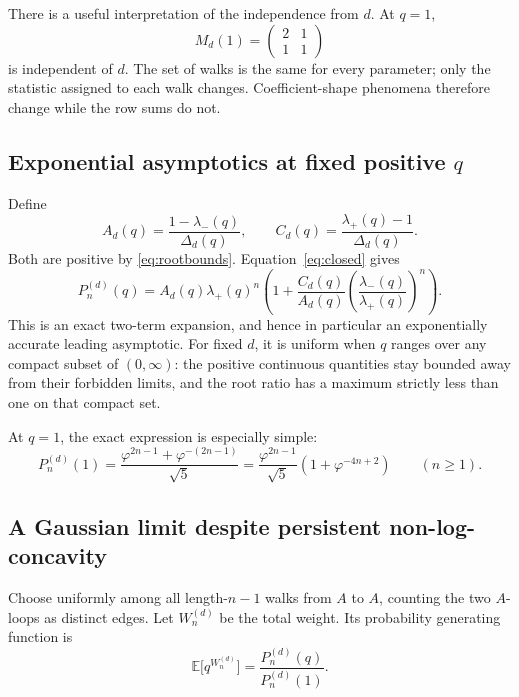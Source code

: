 \documentclass[11pt,letterpaper]{article}
\numberwithin{equation}{section}
\theoremstyle{definition}
\newcommand{\EE}{\mathbb E}
\begin{document}
There is a useful interpretation of the independence from $d$. At $q=1$,
\[
 M_d(1)=\begin{pmatrix}2&1\\1&1\end{pmatrix}
\]
is independent of $d$. The set of walks is the same for every parameter;
only the statistic assigned to each walk changes. Coefficient-shape phenomena
therefore change while the row sums do not.

\subsection{Exponential asymptotics at fixed positive \texorpdfstring{$q$}{q}}

Define
\[
 A_d(q)=\frac{1-\lambda_-(q)}{\Delta_d(q)},\qquad
 C_d(q)=\frac{\lambda_+(q)-1}{\Delta_d(q)}.
\]
Both are positive by \eqref{eq:rootbounds}. Equation~\eqref{eq:closed} gives
\begin{equation}\label{eq:asymp}
 P_n^{(d)}(q)=A_d(q)\lambda_+(q)^n
 \left(1+\frac{C_d(q)}{A_d(q)}
              \left(\frac{\lambda_-(q)}{\lambda_+(q)}\right)^n\right).
\end{equation}
This is an exact two-term expansion, and hence in particular an exponentially
accurate leading asymptotic. For fixed $d$, it is uniform when $q$ ranges over
any compact subset of $(0,\infty)$: the positive continuous quantities stay
bounded away from their forbidden limits, and the root ratio has a maximum
strictly less than one on that compact set.

At $q=1$, the exact expression is especially simple:
\begin{equation}\label{eq:fibasy}
 P_n^{(d)}(1)=\frac{\varphi^{2n-1}+\varphi^{-(2n-1)}}{\sqrt5}
 =\frac{\varphi^{2n-1}}{\sqrt5}
   \left(1+\varphi^{-4n+2}\right)\qquad(n\geq1).
\end{equation}

\subsection{A Gaussian limit despite persistent non-log-concavity}

Choose uniformly among all length-$n-1$ walks from $A$ to $A$, counting the
two $A$-loops as distinct edges. Let $W_n^{(d)}$ be the total weight. Its
probability generating function is
\begin{equation}\label{eq:pgf}
 \EE\bigl[q^{W_n^{(d)}}\bigr]
 =\frac{P_n^{(d)}(q)}{P_n^{(d)}(1)}.
\end{equation}
\end{document}
